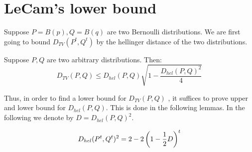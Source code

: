 \section{LeCam's lower bound}
Suppose $P = B(p), Q = B(q)$ are two Bernoulli distributions. 
We are first going to bound $D_{TV}(P^t, Q^t)$ by the hellinger distance of the two distributions.
\begin{lemma}\label{l:totalv_hell}
Suppose $P,Q$ are two arbitrary distributions. Then:
$$
D_{TV}(P,Q) \leq D_{hel}(P,Q) \sqrt{1-\frac{D_{hel}(P,Q)^2}{4}}
$$
\end{lemma}
Thus, in order to find a lower bound for $D_{TV}(P,Q)$ , it suffices 
to prove upper and lower bound for $D_{hel}(P,Q)$. This is done in the following lemmas. 
In the following we denote by $D = D_{hel}(P, Q)^2$.
\begin{lemma}\label{l:hell_n}
$$
D_{hel}(P^t, Q^t)^2 = 2 - 2\left(1 - \frac{1}{2}D\right)^t
$$
\end{lemma}


